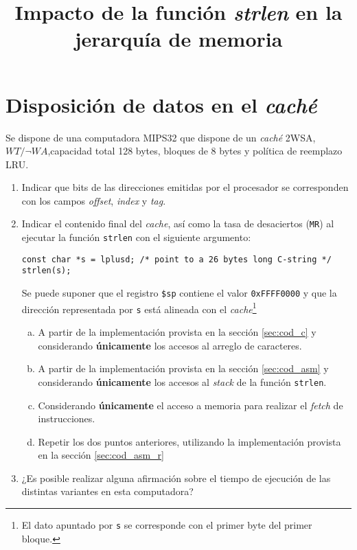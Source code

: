 \documentclass[a4paper]{article}
\title{Impacto de la función \textit{strlen} en la jerarquía de memoria}
\date{}
\begin{document}
\maketitle


\section{Disposición de datos en el \textit{caché}}
Se dispone de una computadora MIPS32 que dispone de un \textit{caché} 2WSA, $WT/\neg WA$,capacidad total 128 bytes,
bloques de 8 bytes y política de reemplazo LRU.

\begin{enumerate}

\item Indicar que bits de las direcciones emitidas por el procesador se corresponden con los campos \textit{offset}, \textit{index} y \textit{tag}.

\item Indicar el contenido final del \textit{cache}, así como la tasa de desaciertos (\texttt{MR}) al ejecutar la 
función \texttt{strlen} con el siguiente argumento:

\begin{lstlisting}
const char *s = lplusd; /* point to a 26 bytes long C-string */
strlen(s);
\end{lstlisting}
 
 Se puede suponer que el registro \texttt{\$sp} contiene el valor \texttt{0xFFFF0000} y que la dirección representada por \texttt{s} está alineada con el \textit{cache}\footnote{El dato apuntado por \texttt{s} se corresponde con el primer byte del primer bloque.}
\begin{enumerate}[a.]
  
  \item A partir de la implementación provista en la sección \ref{sec:cod_c} y considerando \textbf{únicamente} 
	los accesos al arreglo de caracteres.
 
  \item A partir de la implementación provista en la sección \ref{sec:cod_asm} y considerando \textbf{únicamente} 
	los accesos al \textit{stack} de la función \texttt{strlen}.
  
  \item Considerando \textbf{únicamente} el acceso a memoria para realizar el \textit{fetch} de instrucciones.


  \item Repetir los dos puntos anteriores, utilizando la implementación provista en la sección \ref{sec:cod_asm_r}
\end{enumerate}

\item ¿Es posible realizar alguna afirmación sobre el tiempo de ejecución de las distintas variantes en esta computadora?

\end{enumerate}
\end{document}
